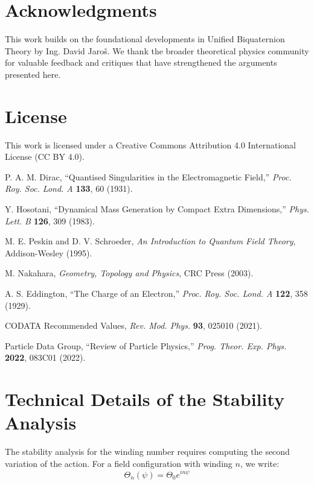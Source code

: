 \documentclass[12pt, a4paper]{article}
\theoremstyle{definition}
\theoremstyle{remark}
\begin{document}
\section*{Acknowledgments}

This work builds on the foundational developments in Unified Biquaternion Theory by Ing. David Jaroš. We thank the broader theoretical physics community for valuable feedback and critiques that have strengthened the arguments presented here.

\section*{License}

This work is licensed under a Creative Commons Attribution 4.0 International License (CC BY 4.0).

\begin{thebibliography}{99}

P. A. M. Dirac,
``Quantised Singularities in the Electromagnetic Field,''
\textit{Proc. Roy. Soc. Lond. A} \textbf{133}, 60 (1931).

Y. Hosotani,
``Dynamical Mass Generation by Compact Extra Dimensions,''
\textit{Phys. Lett. B} \textbf{126}, 309 (1983).

M. E. Peskin and D. V. Schroeder,
\textit{An Introduction to Quantum Field Theory},
Addison-Wesley (1995).

M. Nakahara,
\textit{Geometry, Topology and Physics},
CRC Press (2003).

A. S. Eddington,
``The Charge of an Electron,''
\textit{Proc. Roy. Soc. Lond. A} \textbf{122}, 358 (1929).

CODATA Recommended Values,
\textit{Rev. Mod. Phys.} \textbf{93}, 025010 (2021).

Particle Data Group,
``Review of Particle Physics,''
\textit{Prog. Theor. Exp. Phys.} \textbf{2022}, 083C01 (2022).

\end{thebibliography}

\appendix

\section{Technical Details of the Stability Analysis}

The stability analysis for the winding number requires computing the second variation of the action. For a field configuration with winding $n$, we write:
\begin{equation}
\Theta_n(\psi) = \Theta_0 e^{in\psi}
\end{equation}
\end{document}
